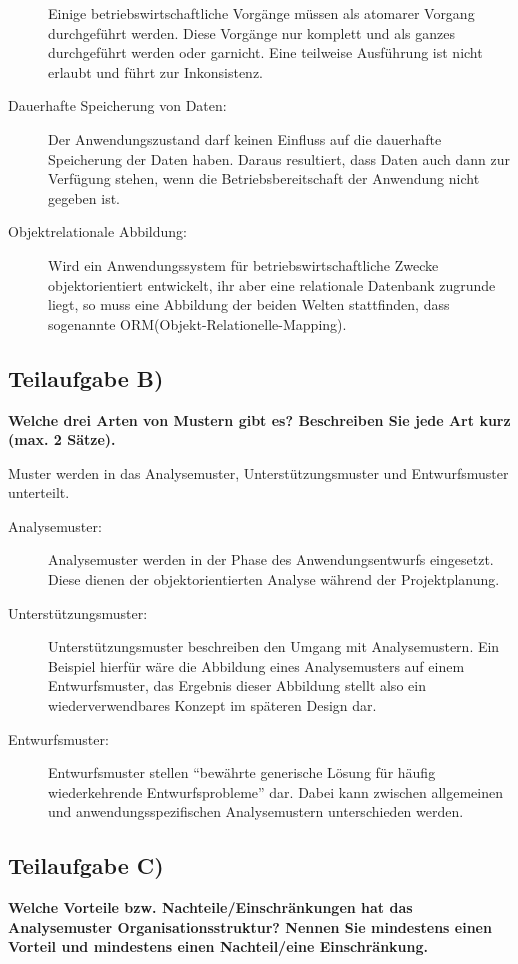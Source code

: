 \begin{description}
  Einige betriebswirtschaftliche Vorgänge müssen als atomarer Vorgang
  durchgeführt werden. Diese Vorgänge nur komplett und als ganzes durchgeführt
  werden oder garnicht. Eine teilweise Ausführung ist nicht erlaubt und führt zur Inkonsistenz.
  \item[Dauerhafte Speicherung von Daten:]
  
  Der Anwendungszustand darf keinen Einfluss auf die dauerhafte Speicherung der Daten haben. Daraus
  resultiert, dass Daten auch dann zur Verfügung stehen, wenn die
  Betriebsbereitschaft der Anwendung nicht gegeben ist.
  \item[Objektrelationale Abbildung:]
  
  Wird ein Anwendungssystem für betriebswirtschaftliche Zwecke objektorientiert entwickelt, ihr aber eine
  relationale Datenbank zugrunde liegt, so muss eine Abbildung der beiden Welten
  stattfinden, dass sogenannte ORM(Objekt-Relationelle-Mapping).
\end{description}   


\subsection{Teilaufgabe B)}
\textbf{Welche drei Arten von Mustern gibt es? Beschreiben Sie jede Art kurz
(max. 2 Sätze).}


Muster werden in das Analysemuster, Unterstützungsmuster und Entwurfsmuster
unterteilt.
\begin{description}
  \item[Analysemuster:]
  
  Analysemuster werden in der Phase des Anwendungsentwurfs
  eingesetzt. Diese dienen der objektorientierten Analyse während der
  Projektplanung.
  \item[Unterstützungsmuster:] 
  
  Unterstützungsmuster beschreiben den Umgang mit
  Analysemustern. Ein Beispiel hierfür wäre die Abbildung eines Analysemusters
  auf einem Entwurfsmuster, das Ergebnis dieser Abbildung stellt also ein
  wiederverwendbares Konzept im späteren Design dar.
  \item[Entwurfsmuster:] 
  
  Entwurfsmuster stellen "`bewährte generische Lösung für
  häufig wiederkehrende Entwurfsprobleme"' dar. Dabei kann \ggfs zwischen
  allgemeinen und anwendungsspezifischen Analysemustern unterschieden werden.
\end{description}

\subsection{Teilaufgabe C)}
\textbf{Welche Vorteile bzw. Nachteile/Einschränkungen hat das Analysemuster
Organisationsstruktur? Nennen Sie mindestens einen Vorteil und mindestens einen
Nachteil/eine Einschränkung.}

